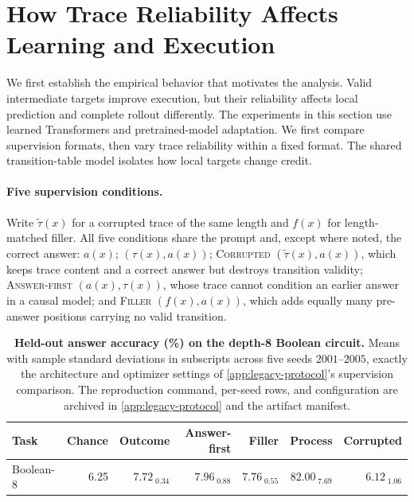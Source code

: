 \section{How Trace Reliability Affects Learning and Execution}
\label{sec:reliability}
\label{sec:formats}

We first establish the empirical behavior that motivates the analysis.
Valid intermediate targets improve execution, but their reliability affects
local prediction and complete rollout differently. The experiments in this
section use learned Transformers and pretrained-model adaptation. We first
compare supervision formats, then vary trace reliability within a fixed format.
The shared transition-table model isolates how local targets change credit.

\paragraph{Five supervision conditions.}
Write $\widetilde\tau(x)$ for a corrupted trace of the same length and $f(x)$
for length-matched filler.  All five conditions share the prompt and, except
where noted, the correct answer: \outcome{} $a(x)$; \proc{} $(\tau(x),a(x))$;
\textsc{Corrupted} $(\widetilde\tau(x),a(x))$, which keeps trace content and a
correct answer but destroys transition validity; \textsc{Answer-first}
$(a(x),\tau(x))$, whose trace cannot condition an earlier answer in a causal
model; and \textsc{Filler} $(f(x),a(x))$, which adds equally many pre-answer
positions carrying no valid transition.

\begin{table}[t]
\centering
\small
\begin{tabular}{lrrrrrr}
\toprule
Task & Chance & Outcome & Answer-first & Filler & Process & Corrupted\\
\midrule
Boolean-8 & 6.25 & \(7.72_{\;\text{0.34}}\) & \(7.96_{\;\text{0.88}}\) & \(7.76_{\;\text{0.55}}\) & \(82.00_{\;\text{7.69}}\) & \(6.12_{\;\text{1.06}}\)\\
\bottomrule
\end{tabular}
\caption{\textbf{Held-out answer accuracy (\%) on the depth-8 Boolean circuit.}
Means with sample standard deviations in subscripts across five seeds
$2001$--$2005$, exactly the architecture and optimizer settings of
\cref{app:legacy-protocol}'s supervision comparison. The reproduction command,
per-seed rows, and configuration are archived in \cref{app:legacy-protocol}
and the artifact manifest.}
\label{tab:supervision-comparison}
\end{table}

